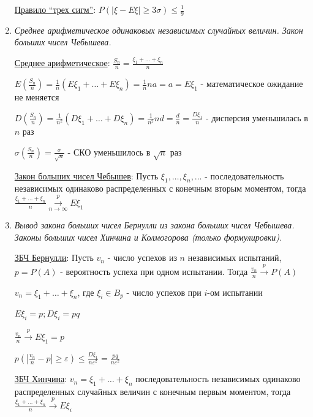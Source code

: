 \documentclass[12pt]{article}
\begin{document}
\begin{enumerate}
    \hyperlink{ruleofthreesigmas}{Правило \enquote{трех сигм}}: \Ths $P(|\xi - E\xi| \geq 3\sigma) \leq \frac{1}{9}$

    \item \textit{Среднее арифметическое одинаковых независимых случайных величин. Закон больших чисел Чебышева.}

    \hyperlink{averagevalueofrandomvariables}{Среднее арифметическое}: $\frac{S_n}{n} = \frac{\xi_1 + \dots + \xi_n}{n}$

    $E\left(\frac{S_n}{n}\right) = \frac{1}{n} (E\xi_1 + \dots + E\xi_n) = \frac{1}{n} na = a = E\xi_1$ - математическое ожидание не меняется

    $D\left(\frac{S_n}{n}\right) = \frac{1}{n^2} (D\xi_1 + \dots + D\xi_n) = \frac{1}{n^2} nd = \frac{d}{n} = \frac{D\xi_1}{n}$ - дисперсия уменьшилась в $n$ раз

    $\sigma\left(\frac{S_n}{n}\right) = \frac{\sigma}{\sqrt{n}}$ - СКО уменьшилось в $\sqrt{n}$ раз

    \hyperlink{lawofbignumberschebyshev}{Закон больших чисел Чебышев}: \Ths Пусть $\xi_1, \dots, \xi_n, \dots$ - последовательность независимых одинаково распределенных с конечным вторым моментом,
    тогда $\frac{\xi_1 + \dots + \xi_n}{n} \overset{p}{\underset{n \to \infty}{\longrightarrow}} E\xi_1$

    \item \textit{Вывод закона больших чисел Бернулли из закона больших чисел Чебышева. Законы больших чисел Хинчина и Колмогорова (только формулировки).}

    \hyperlink{lawofbignumbersbernoulli2}{ЗБЧ Бернулли}: \Ths Пусть $v_n$ - число успехов из $n$ независимых испытаний, $p = P(A)$ - вероятность успеха при одном испытании.
    Тогда $\frac{v_n}{n} \overset{p}{\longrightarrow} P(A)$

    \begin{MyProof}
        $v_n = \xi_1 + \dots + \xi_n$, где $\xi_i \in B_p$ - число успехов при $i$-ом испытании

        $E\xi_i = p; D\xi_i = pq$

        $\frac{v_n}{n} \overset{p}{\longrightarrow} E\xi_1 = p$

        $p\left(\left|\frac{v_n}{n} - p\right| \geq \varepsilon\right) \leq \frac{D\xi_1}{n\varepsilon^2} = \frac{pq}{n\varepsilon^2}$
    \end{MyProof}

    \hyperlink{lawofbignumberskhinchin}{ЗБЧ Хинчина}: \Ths $v_n = \xi_1 + \dots + \xi_n$ последовательность независимых одинаково распределенных случайных величин с конечным первым моментом, тогда
    $\frac{\xi_1 + \dots + \xi_n}{n} \overset{p}{\longrightarrow} E\xi_i$


\end{enumerate}
\end{document}
